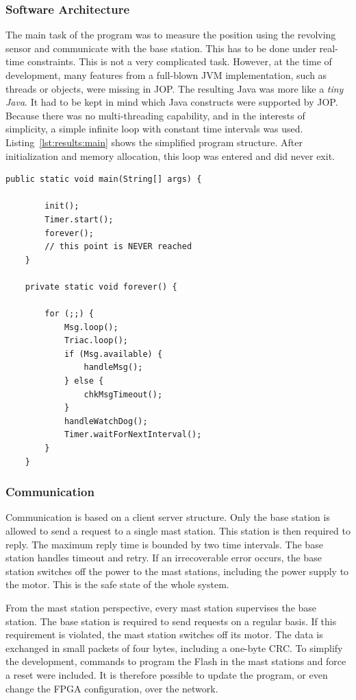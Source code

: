 \subsubsection{Software Architecture}

The main task of the program was to measure the position using the
revolving sensor and communicate with the base station. This has to
be done under real-time constraints. This is not a very complicated
task. However, at the time of development, many features from a
full-blown JVM implementation, such as threads or objects, were
missing in JOP. The resulting Java was more like a \emph{tiny Java}.
It had to be kept in mind which Java constructs were supported by
JOP. Because there was no multi-threading capability, and in the
interests of simplicity, a simple infinite loop with constant time
intervals was used. Listing~\ref{lst:results:main} shows the
simplified program structure. After initialization and memory
allocation, this loop was entered and did never exit.

\begin{lstlisting}[float,caption=Simplified program structure,
label=lst:results:main]
    public static void main(String[] args) {

        init();
        Timer.start();
        forever();
        // this point is NEVER reached
    }

    private static void forever() {

        for (;;) {
            Msg.loop();
            Triac.loop();
            if (Msg.available) {
                handleMsg();
            } else {
                chkMsgTimeout();
            }
            handleWatchDog();
            Timer.waitForNextInterval();
        }
    }
\end{lstlisting}

\subsubsection{Communication}

Communication is based on a client server structure. Only the base
station is allowed to send a request to a single mast station. This
station is then required to reply. The maximum reply time is bounded
by two time intervals. The base station handles timeout and retry.
If an irrecoverable error occurs, the base station switches off the
power to the mast stations, including the power supply to the motor.
This is the safe state of the whole system.

From the mast station perspective, every mast station supervises the
base station. The base station is required to send requests on a
regular basis. If this requirement is violated, the mast station
switches off its motor. The data is exchanged in small packets of
four bytes, including a one-byte CRC. To simplify the development,
commands to program the Flash in the mast stations and force a reset
were included. It is therefore possible to update the program, or
even change the FPGA configuration, over the network.

